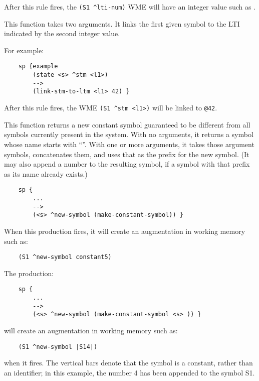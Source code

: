 \begin{description}
	After this rule fires, the \verb|(S1 ^lti-num)| WME will have an integer value such as .


\item [\soarb{link-stm-to-ltm} --- ]
	This function takes two arguments. It links the first given symbol to the LTI indicated by the second integer value.

	For example:

	\begin{verbatim}
	sp {example
	    (state <s> ^stm <l1>)
	    -->
	    (link-stm-to-ltm <l1> 42) }
	\end{verbatim}

	After this rule fires, the WME \verb=(S1 ^stm <l1>)= will be linked to \verb=@42=.


\item [\soarb{make-constant-symbol} --- ]
	This function returns a new constant symbol guaranteed to be different from all symbols currently present in the system.  With no arguments, it returns a symbol whose name starts with ``''.  With one or more arguments, it takes those argument symbols, concatenates them, and uses that as the prefix for the new symbol. (It may also append a number to the resulting symbol, if a symbol with that prefix as its name already exists.)

	\begin{verbatim}
	sp {
	    ...
	    -->
	    (<s> ^new-symbol (make-constant-symbol)) }
	\end{verbatim}

	When this production fires, it will create an augmentation in working memory such as:

	\begin{verbatim}
	(S1 ^new-symbol constant5)
	\end{verbatim}
	\vspace{12pt}

	The production:

	\begin{verbatim}
	sp {
	    ...
	    -->
	    (<s> ^new-symbol (make-constant-symbol <s> )) }
	\end{verbatim}

	will create an augmentation in working memory such as:
	\begin{verbatim}
	(S1 ^new-symbol |S14|)
	\end{verbatim}

	when it fires. The vertical bars denote that the symbol is a constant, rather than an identifier; in this example, the number 4 has been appended to the symbol S1.


\end{description}
